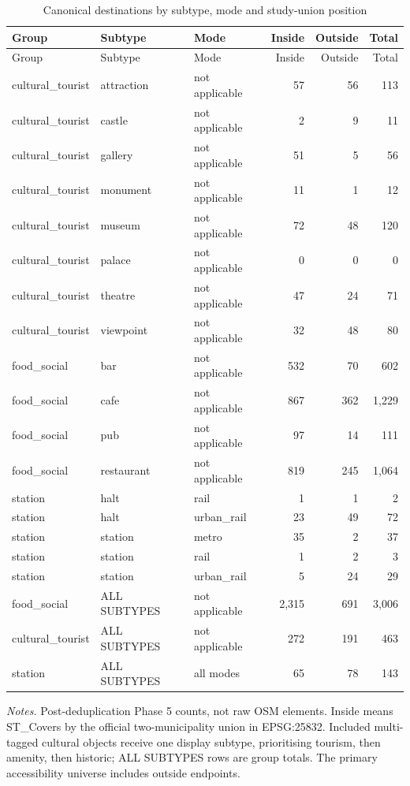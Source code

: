 \begin{landscape}
\small
\begin{longtable}{>{\raggedright\arraybackslash}p{3.3cm}>{\raggedright\arraybackslash}p{5.3cm}>{\raggedright\arraybackslash}p{2.7cm}rrr}
\caption{Canonical destinations by subtype, mode and study-union position}\label{tab:destination-counts}\\
\toprule
Group & Subtype & Mode & Inside & Outside & Total \\
\midrule
\endfirsthead
\toprule
Group & Subtype & Mode & Inside & Outside & Total \\
\midrule
\endhead
cultural\_\allowbreak{}tourist & attraction & not applicable & 57 & 56 & 113 \\
cultural\_\allowbreak{}tourist & castle & not applicable & 2 & 9 & 11 \\
cultural\_\allowbreak{}tourist & gallery & not applicable & 51 & 5 & 56 \\
cultural\_\allowbreak{}tourist & monument & not applicable & 11 & 1 & 12 \\
cultural\_\allowbreak{}tourist & museum & not applicable & 72 & 48 & 120 \\
cultural\_\allowbreak{}tourist & palace & not applicable & 0 & 0 & 0 \\
cultural\_\allowbreak{}tourist & theatre & not applicable & 47 & 24 & 71 \\
cultural\_\allowbreak{}tourist & viewpoint & not applicable & 32 & 48 & 80 \\
food\_\allowbreak{}social & bar & not applicable & 532 & 70 & 602 \\
food\_\allowbreak{}social & cafe & not applicable & 867 & 362 & 1,229 \\
food\_\allowbreak{}social & pub & not applicable & 97 & 14 & 111 \\
food\_\allowbreak{}social & restaurant & not applicable & 819 & 245 & 1,064 \\
station & halt & rail & 1 & 1 & 2 \\
station & halt & urban\_\allowbreak{}rail & 23 & 49 & 72 \\
station & station & metro & 35 & 2 & 37 \\
station & station & rail & 1 & 2 & 3 \\
station & station & urban\_\allowbreak{}rail & 5 & 24 & 29 \\
food\_\allowbreak{}social & ALL SUBTYPES & not applicable & 2,315 & 691 & 3,006 \\
cultural\_\allowbreak{}tourist & ALL SUBTYPES & not applicable & 272 & 191 & 463 \\
station & ALL SUBTYPES & all modes & 65 & 78 & 143 \\
\bottomrule
\end{longtable}
{\footnotesize\noindent\emph{Notes.} Post-deduplication Phase 5 counts, not raw OSM elements. Inside means ST\_Covers by the official two-municipality union in EPSG:25832. Included multi-tagged cultural objects receive one display subtype, prioritising tourism, then amenity, then historic; ALL SUBTYPES rows are group totals. The primary accessibility universe includes outside endpoints.\par}
\end{landscape}
